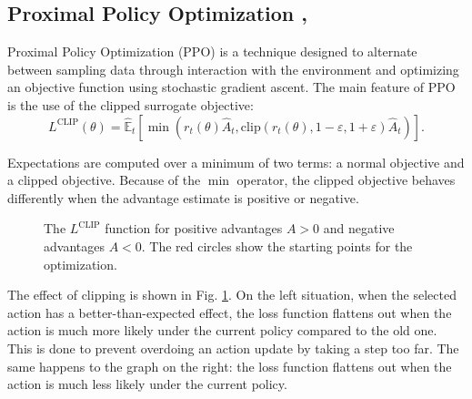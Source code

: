 \documentclass[a4paper, 12pt]{article}
\numberwithin{equation}{section}
\begin{document}
\subsection[Proximal Policy Optimization]{Proximal Policy Optimization \cite{ppo-algorithm}, \cite{understanding-ppo}}
Proximal Policy Optimization (PPO) is a technique designed to alternate between sampling data through interaction with the environment and optimizing an objective function using stochastic gradient ascent. The main feature of PPO is the use of the clipped surrogate objective:
\begin{equation}
	L^\mathrm{CLIP}\left(\theta\right)=\hat{\mathbb{E}}_t\left[\min\left(r_t\left(\theta\right)\hat{A}_t,\mathrm{clip}\left(r_t\left(\theta\right),1-\varepsilon,1+\varepsilon\right)\hat{A}_t\right)\right].
\end{equation}

Expectations are computed over a minimum of two terms: a normal objective and a clipped objective. Because of the $\min$ operator, the clipped objective behaves differently when the advantage estimate is positive or negative.

\begin{figure}[h]
	\centering
		\caption{The $L^\mathrm{CLIP}$ function for positive advantages $A>0$ and negative advantages $A<0$. The red circles show the starting points for the optimization.}
	\label{fig:clipped}
\end{figure}

The effect of clipping is shown in Fig. \ref{fig:clipped}. On the left situation, when the selected action has a better-than-expected effect, the loss function flattens out when the action is much more likely under the current policy compared to the old one. This is done to prevent overdoing an action update by taking a step too far. The same happens to the graph on the right: the loss function flattens out when the action is much less likely under the current policy.
\end{document}
